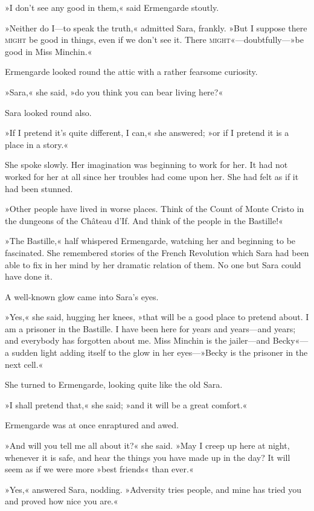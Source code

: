 »I don't see any good in them,« said Ermengarde stoutly.

»Neither do I—to speak the truth,« admitted Sara, frankly. »But I suppose there \textsc{might} be good in things, even if we don't see it. There \textsc{might}«—doubtfully—»be good in Miss Minchin.«

Ermengarde looked round the attic with a rather fearsome curiosity.

»Sara,« she said, »do you think you can bear living here?«

Sara looked round also.

»If I pretend it's quite different, I can,« she answered; »or if I pretend it is a place in a story.«

She spoke slowly. Her imagination was beginning to work for her. It had not worked for her at all since her troubles had come upon her. She had felt as if it had been stunned.

»Other people have lived in worse places. Think of the Count of Monte Cristo in the dungeons of the Château d'If. And think of the people in the Bastille!«

»The Bastille,« half whispered Ermengarde, watching her and beginning to be fascinated. She remembered stories of the French Revolution which Sara had been able to fix in her mind by her dramatic relation of them. No one but Sara could have done it.

A well-known glow came into Sara's eyes.

»Yes,« she said, hugging her knees, »that will be a good place to pretend about. I am a prisoner in the Bastille. I have been here for years and years—and years; and everybody has forgotten about me. Miss Minchin is the jailer—and Becky«—a sudden light adding itself to the glow in her eyes—»Becky is the prisoner in the next cell.«

She turned to Ermengarde, looking quite like the old Sara.

»I shall pretend that,« she said; »and it will be a great comfort.«

Ermengarde was at once enraptured and awed.

»And will you tell me all about it?« she said. »May I creep up here at night, whenever it is safe, and hear the things you have made up in the day? It will seem as if we were more »best friends« than ever.«

»Yes,« answered Sara, nodding. »Adversity tries people, and mine has tried you and proved how nice you are.«